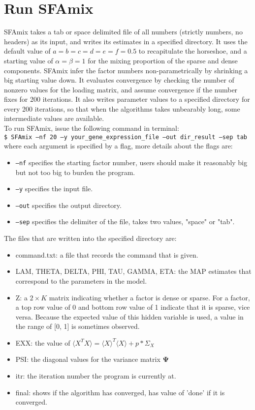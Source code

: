 \documentclass[11pt,a4paper]{article}
\begin{document}
\section{Run SFAmix}
SFAmix takes a tab or space delimited file of all numbers (strictly
numbers, no headers) as its input, and writes its estimates in a specified directory. It uses the default
value of $a=b=c=d=e=f=0.5$ to recapitulate the horseshoe,
and a starting value of $\alpha=\beta=1$ for the mixing proportion of the sparse and dense
components. SFAmix infer the factor numbers non-parametrically by
shrinking a big starting value down. It evaluates convergence by checking the number of
nonzero values for the loading matrix, and assume convergence if the
number fixes for 200 iterations. It also writes
parameter values to a specified directory for every 200 iterations, so
that when the algorithms takes unbearably long, some intermediate values
are available.\\  
To run SFAmix, issue the following command in terminal:\\
\noindent \texttt{\$ SFAmix --nf 20 --y your\_gene\_expression\_file --out dir\_result --sep tab}\\
where each argument is specified by a flag, more details about the
flags are:
\begin{itemize}
\item
\texttt{--nf} specifies the starting factor number, users should make it reasonably big but not too big to burden the program.
\item
\texttt{--y} specifies the input file.
 \item
\texttt{--out} specifies the output directory.
\item
\texttt{--sep} specifies the delimiter of the file, takes two values, "space"
or "tab".
\end{itemize}
The files that are written into the specified directory are:
\begin{itemize}
\item
command.txt: a file that records the command that is given.
\item
LAM, THETA, DELTA, PHI, TAU, GAMMA, ETA: the MAP estimates that
correspond to the parameters in the model.
\item
Z: a $2\times K$ matrix indicating whether a factor is dense or
sparse. For a factor, a top row value of 0 and bottom row value of 1
indicate that it is sparse, vice versa. Because the expected value of
this hidden variable is used, a value in the
range of [0, 1] is  sometimes observed. 
\item
EXX: the value of $\langle X^TX \rangle=\langle X \rangle^T \langle X
\rangle + p*\Sigma_X$
\item
PSI: the diagonal values for the variance matrix $\mathbf{\Psi}$
\item
itr: the iteration number the program is currently at.
\item
final: shows if the algorithm has converged, has value of 'done' if it
is converged. 
\end{itemize}
\end{document}
